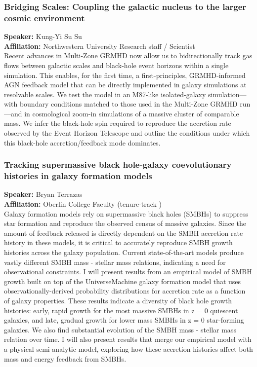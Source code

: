 \hypertarget{abs-46}{}
\subsubsection*{Bridging Scales: Coupling the galactic nucleus to the larger cosmic environment}
\textbf{Speaker:} Kung-Yi Su Su \\
\textbf{Affiliation:} Northwestern University \textperiodcentered{} Research staff / Scientist\\
Recent advances in Multi-Zone GRMHD now allow us to bidirectionally track gas flows between galactic scales and black-hole event horizons within a single simulation. This enables, for the first time, a first-principles, GRMHD-informed AGN feedback model that can be directly implemented in galaxy simulations at resolvable scales. We test the model in an M87-like isolated-galaxy simulation—with boundary conditions matched to those used in the Multi-Zone GRMHD run—and in cosmological zoom-in simulations of a massive cluster of comparable mass. We infer the black-hole spin required to reproduce the accretion rate observed by the Event Horizon Telescope and outline the conditions under which this black-hole accretion/feedback mode dominates.

\hypertarget{abs-47}{}
\subsubsection*{Tracking supermassive black hole-galaxy coevolutionary histories in galaxy formation models}
\textbf{Speaker:} Bryan Terrazas \\
\textbf{Affiliation:} Oberlin College \textperiodcentered{} Faculty (tenure-track )\\
Galaxy formation models rely on supermassive black holes (SMBHs) to suppress star formation and reproduce the observed census of massive galaxies. Since the amount of feedback released is directly dependent on the SMBH accretion rate history in these models, it is critical to accurately reproduce SMBH growth histories across the galaxy population. Current state-of-the-art models produce vastly different SMBH mass - stellar mass relations, indicating a need for observational constraints. I will present results from an empirical model of SMBH growth built on top of the UniverseMachine galaxy formation model that uses observationally-derived probability distributions for accretion rate as a function of galaxy properties. These results indicate a diversity of black hole growth histories: early, rapid growth for the most massive SMBHs in z = 0 quiescent galaxies, and late, gradual growth for lower mass SMBHs in z = 0 star-forming galaxies. We also find substantial evolution of the SMBH mass - stellar mass relation over time. I will also present results that merge our empirical model with a physical semi-analytic model, exploring how these accretion histories affect both mass and energy feedback from SMBHs.


